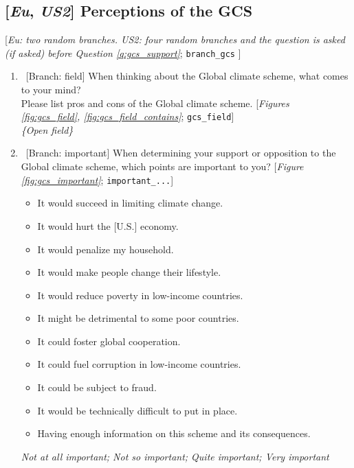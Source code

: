 \subsection*{[\textit{Eu}, \textit{US2}] Perceptions of the GCS}\label{subsec:questionnaire_perceptions}
[\textit{Eu: two random branches. \textit{US2}: four random branches and the question is asked (if asked) before Question \ref{q:gcs_support}}; \verb|branch_gcs| ] 
\begin{enumerate}[resume] \item ~[Branch: field]  \label{q:gcs_field} When thinking about the Global climate scheme, what comes to your mind? \\ Please list pros and cons of the Global climate scheme. [\textit{Figures \ref{fig:gcs_field}, \ref{fig:gcs_field_contains}}; \verb|gcs_field|]
\\ \textit{\{Open field\}} 
\item ~[Branch: important]  \label{q:gcs_important} When determining your support or opposition to the Global climate scheme, which points are important to you? [\textit{Figure \ref{fig:gcs_important}}; \verb|important_...|]
\begin{itemize}
    \item It would succeed in limiting climate change. 
    \item It would hurt the [U.S.] economy. 
    \item It would penalize my household. 
    \item It would make people change their lifestyle. 
    \item It would reduce poverty in low-income countries. 
    \item It might be detrimental to some poor countries. 
    \item It could foster global cooperation. 
    \item It could fuel corruption in low-income countries. 
    \item It could be subject to fraud. 
    \item It would be technically difficult to put in place. 
    \item Having enough information on this scheme and its consequences.
\end{itemize}
\textit{Not at all important; Not so important; Quite important; Very important}
\end{enumerate}

